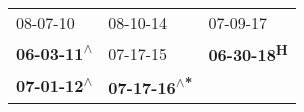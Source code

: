 \begin{supertabular}{lll}
                  08-07-10\textsuperscript{} &                    08-10-14\textsuperscript{} &            07-09-17\textsuperscript{} \\
 \textbf{06-03-11\textsuperscript{$\wedge$}} &                    07-17-15\textsuperscript{} &  \textbf{06-30-18\textsuperscript{H}} \\
 \textbf{07-01-12\textsuperscript{$\wedge$}} &  \textbf{07-17-16\textsuperscript{$\wedge$*}} &                                       \\
\end{supertabular}
